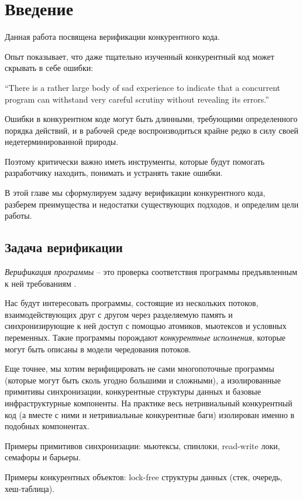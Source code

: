 \chapter{Введение}\label{ch:ch1}

Данная работа посвящена верификации конкурентного кода.

Опыт показывает, что даже тщательно изученный конкурентный код может скрывать в себе ошибки:

“There is a rather large body of sad experience to indicate that a concurrent program can withstand very careful scrutiny without revealing its errors.” \autocite{Liveness}

Ошибки в конкурентном коде могут быть длинными, требующими определенного порядка действий, и в рабочей среде воспроизводиться крайне редко в силу своей недетерминированной природы. 

Поэтому критически важно иметь инструменты, которые будут помогать разработчику находить, понимать и устранять такие ошибки.

В этой главе мы сформулируем задачу верификации конкурентного кода, разберем преимущества и недостатки существующих подходов, и определим цели работы.

\section{Задача верификации}

\emph{Верификация программы} – это проверка соответствия программы предъявленным к ней требованиям \autocite{Intro}.

Нас будут интересовать программы, состоящие из нескольких потоков, взаимодействующих друг с другом через разделяемую память и синхронизирующие к ней доступ с помощью атомиков, мьютексов и условных переменных. Такие программы порождают \emph{конкурентные исполнения}, которые могут быть описаны в модели чередования потоков.

Еще точнее, мы хотим верифицировать не сами многопоточные программы (которые могут быть сколь угодно большими и сложными), а изолированные примитивы синхронизации, конкурентные структуры данных и базовые инфраструктурные компоненты. На практике весь нетривиальный конкурентный код (а вместе с ними и нетривиальные конкурентные баги) изолирован именно в подобных компонентах.

Примеры примитивов синхронизации: мьютексы, спинлоки, read-write локи, семафоры и барьеры.

Примеры конкурентных объектов: lock-free структуры данных (стек, очередь, хеш-таблица).

